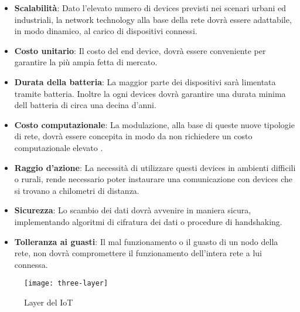 \begin{itemize}
\item \textbf{Scalabilità}: Dato l'elevato numero di devices previsti nei scenari
urbani ed industriali, la network technology alla base della rete dovrà essere 
adattabile, in modo dinamico, al carico di dispositivi connessi.
\item \textbf{Costo unitario}: Il costo del end device, dovrà essere conveniente
per garantire la più ampia fetta di mercato.
\item \textbf{Durata della batteria}: La maggior parte dei dispositivi sarà
limentata tramite batteria. Inoltre la ogni devices dovrà garantire una durata
minima dell batteria di circa una decina d'anni. 
\item \textbf{Costo computazionale}: La modulazione, alla base di queste nuove
tipologie di rete, dovrà essere concepita in modo da non richiedere un costo
computazionale elevato .
\item \textbf{Raggio d'azione}: La necessità di utilizzare questi devices in ambienti
difficili o rurali, rende necessario poter instaurare una comunicazione con
devices che si trovano a chilometri di distanza.
\item \textbf{Sicurezza}: Lo scambio dei dati dovrà avvenire in maniera sicura,
implementando algoritmi di cifratura dei dati o procedure di handshaking.
\item \textbf{Tolleranza ai guasti}: Il mal funzionamento  o il guasto di un
nodo della rete,  non dovrà compromettere il funzionamento dell'intera rete a lui connessa. 
\end{itemize}

\begin{figure}[h]
        \centering 
                \texttt{[image: three-layer]}
        \caption{Layer del IoT}
\end{figure}

